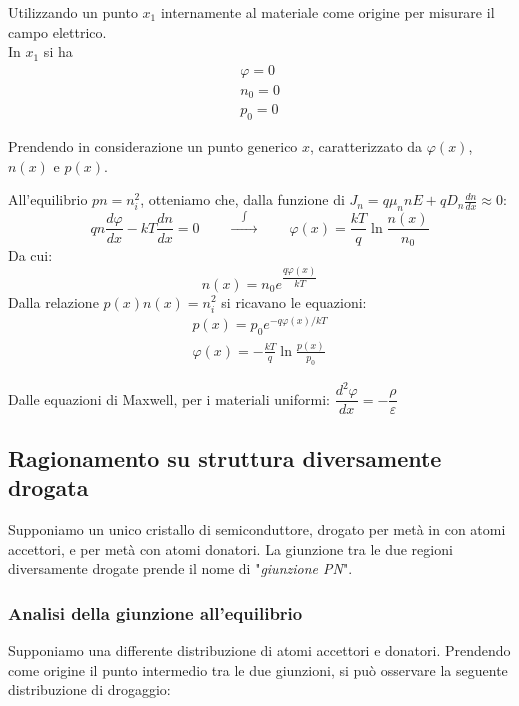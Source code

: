 \documentclass[../template]{subfiles}
\begin{document}
Utilizzando un punto $x_1$ internamente al materiale come origine per misurare il campo elettrico.
\\
In $x_1$ si ha
\begin{align*}
    \varphi = 0 \\
    n_0 = 0 \\
    p_0 = 0
\end{align*}

Prendendo in considerazione un punto generico $x$, caratterizzato da $\varphi(x)$, $n(x)$ e $p(x)$.

All'equilibrio $pn = n_i^2$, otteniamo che, dalla funzione di $J_n = q \mu_n  n E + q D_n \frac{dn}{dx} \approx 0$:
\[
    qn \frac{d\varphi}{dx} - kT\frac{dn}{dx} = 0 \qquad
    \xrightarrow{\quad\int\quad} \qquad
    \varphi(x) = \frac{kT}{q} \ln \frac{n(x)}{n_0}
\]
Da cui:
\[
    n(x) = n_0 e^{\dfrac{q\varphi(x)}{kT}}
\]
Dalla relazione $p(x) n(x) = n_i ^ 2$ si ricavano le equazioni:
\begin{align*}
    p(x) = p_0 e^{-q\varphi(x) / kT}
    \\
    \varphi(x) = - \frac{kT}{q} \ln \frac{p(x)}{p_0}
\end{align*}

Dalle equazioni di Maxwell, per i materiali uniformi: $\dfrac{d^2 \varphi}{dx} = -\dfrac{\rho}{\varepsilon}$

\subsection{Ragionamento su struttura diversamente drogata}
Supponiamo un unico cristallo di semiconduttore, drogato per metà in con atomi accettori, e per metà con atomi donatori.
La giunzione tra le due regioni diversamente drogate prende il nome di "\textit{giunzione PN}".


\subsubsection{Analisi della giunzione all'equilibrio}
Supponiamo una differente distribuzione di atomi accettori e donatori. Prendendo come origine il punto intermedio tra le due giunzioni, si può
osservare la seguente distribuzione di drogaggio:

\begin{figure}[h]
    \centering
\end{figure}
\end{document}
